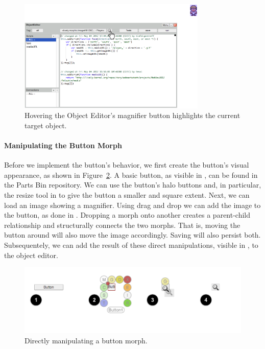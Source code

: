 \begin{figure}[h]
    \centering
    \includegraphics[width=0.8\textwidth]{figures/3_motivation/2_magnifierBehavior.png}
    \caption{Hovering the Object Editor's magnifier button highlights the current target object.}
    \label{fig:MagnifierBehavior}
\end{figure}

\paragraph{Manipulating the Button Morph}
Before we implement the button's behavior, we first create the button's visual appearance, as shown in Figure~\ref{fig:ButtonBuilding}.
A basic button, as visible in , can be found in the Parts Bin repository.
We can use the button's halo buttons and, in particular, the resize tool in  to give the button a smaller and square extent.
Next, we can load an image showing a magnifier.
Using drag and drop we can add the image to the button, as done in .
Dropping a morph onto another creates a parent-child relationship and structurally connects the two morphs.
That is, moving the button around will also move the image accordingly.
Saving will also persist both.
Subsequentely, we can add the result of these direct manipulations, visible in , to the object editor.

\begin{figure}[h]
    \centering
    \includegraphics[width=\textwidth]{figures/3_motivation/3_buildingTheButton.png}
    \caption{Directly manipulating a button morph.}
    \label{fig:ButtonBuilding}
\end{figure}

